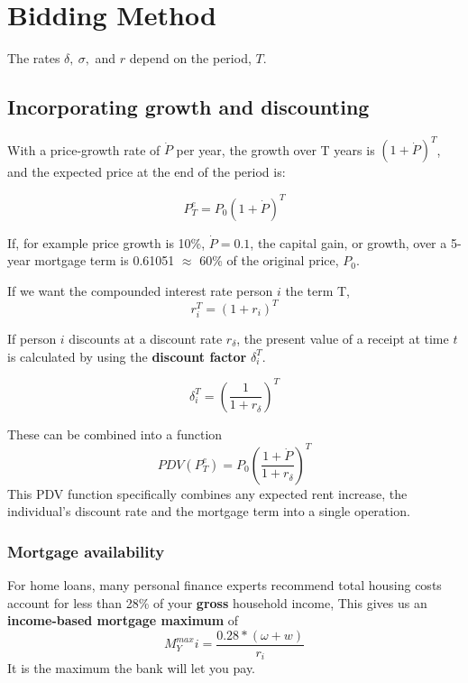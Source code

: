 \chapter[Bidding]{Bidding Method}
\label{AppendixB}

The rates $\delta,\ \sigma,$ and $r$ depend on the period, $T$. 

\section{Incorporating growth and discounting}

With a price-growth rate of $\dot P$ per year, the growth over T years is $(1+\dot P)^T$, and  %
the expected price at the end of the period is:

\[P^e_T=P_0(1+\dot P)^T\]

If, for example price growth is 10\%, $\dot P= 0.1$, the {capital gain}, or growth, over a 5-year mortgage term is 0.61051 $\approx$ 60\% of the original price, $P_0$.

If we want the compounded interest rate person $i$ the term T,
\[r_i^T=(1+r_i)^T\]

If person $i$  discounts at a discount rate $r_\delta$, the present value of a receipt at time $t$ is calculated by using the \textbf{discount factor} $\delta_i^T$.

\[\delta_i^T= \left( \frac{1}{1+r_\delta} \right)^T \]
 
These can be combined into a function %
\[ PDV(P^e_T)=P_0\left( \frac{1+\dot P}{1+r_\delta} \right)^T \]
This PDV function specifically combines any expected rent increase, the individual's discount rate and the mortgage term into a single operation. 


\subsection{Mortgage availability}
For home loans, many personal finance experts recommend total housing costs account for less than 28\% of your \textbf{gross} household income, This gives us an \textbf{income-based  mortgage maximum} of \[M^{max}_Yi = \frac{0.28*(\omega+w)}{r_i}\] It is the maximum the bank will let you pay.

